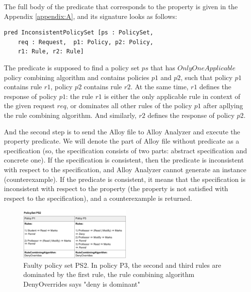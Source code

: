 \documentclass[letterpaper]{acm_proc_article-sp}
\begin{document}
The full body of the predicate that corresponds to the property is given in the Appendix \ref{appendix:A}, and its signature looks as follows:	

\begin{verbatim}
pred InconsistentPolicySet [ps : PolicySet, 
    req : Request,  p1: Policy, p2: Policy, 
    r1: Rule, r2: Rule]
\end{verbatim}

The predicate is supposed to find a policy set $ps$ that has $OnlyOneApplicable$ policy combining algorithm and contains policies $p1$ and $p2$, such that policy $p1$ contains rule $r1$, policy $p2$ contains rule $r2$. At the same time, $r1$ defines the response of policy $p1$: the rule $ r1$ is either the only applicable rule in context of the given request $req$, or dominates all other rules of the policy $p1$ after apllying the rule combining algorithm. And similarly, $r2$ defines the response of policy $p2$.

And the second step is to send the Alloy file to Alloy Analyzer and execute the property predicate. We will denote the part of Alloy file without predicate as a specification (so, the specification consists of two parts: abstract specification and concrete one). If the specification is consistent, then the predicate is inconsistent with respect to the specification, and Alloy Analyzer cannot generate an instance (counterexample). If the predicate is consistent, it means that the specification is inconsistent with respect to the property (the property is not satisfied with respect to the specification), and a counterexample is returned.

\begin{figure}[h]
\includegraphics[width=0.5\textwidth]{policyset_faulty.png}
\caption{Faulty policy set PS2. In policy P3, the second and third rules are dominated by the first rule, the rule combining algorithm DenyOverrides says "deny is dominant"}    
  \label{fig:policysetfaulty}
\end{figure}
\end{document}
